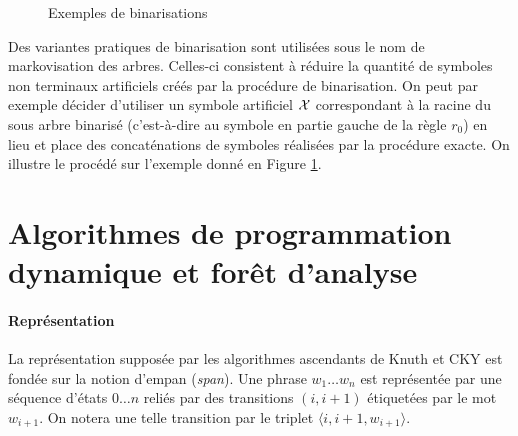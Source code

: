 \documentclass[11pt,openany]{book}
\begin{document}
\begin{figure}[htbp]
\begin{center}
\end{center}
\caption{\label{fig-markovization}Exemples de binarisations}
\end{figure}
Des variantes pratiques de binarisation sont utilisées sous le nom de markovisation des arbres. 
Celles-ci consistent à réduire la quantité de symboles non terminaux artificiels créés par la procédure de binarisation.
On peut par exemple décider d'utiliser un symbole artificiel ${\cal X}$ correspondant à la racine du sous arbre binarisé
(c'est-à-dire au symbole en partie gauche de la règle $r_0$) en lieu et place des concaténations de symboles réalisées par la procédure exacte. On illustre le procédé sur l'exemple donné en Figure \ref{fig-markovization}.







\section{Algorithmes de programmation dynamique et forêt d'analyse}

\paragraph{Représentation} La représentation supposée par les algorithmes ascendants de Knuth et CKY est fondée sur la notion d'empan ({\em span}).
Une phrase $w_1 \ldots w_n$ est représentée par une séquence d'états $0\ldots n$ 
reliés par des transitions $(i,i+1)$ étiquetées  par le mot $w_{i+1}$. 
On notera une telle transition par le triplet $\langle i,i+1,w_{i+1} \rangle$.
\end{document}
